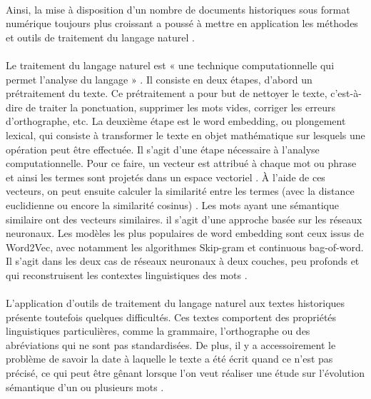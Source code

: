 \documentclass{article}
\begin{document}
\paragraph{}
Ainsi, la mise à disposition d’un nombre de documents historiques sous format numérique toujours plus croissant a poussé à mettre en application les méthodes et outils de traitement du langage naturel \cite[p. 1]{liebeskind2020deep}. 
\paragraph{}
Le traitement du langage naturel est « une technique computationnelle qui permet l’analyse du langage » \cite[p. 3]{di2021latin}. Il consiste en deux étapes, d’abord un prétraitement du texte. Ce prétraitement a pour but de nettoyer le texte, c’est-à-dire de traiter la ponctuation, supprimer les mots vides, corriger les erreurs d’orthographe, etc. La deuxième étape est le word embedding, ou plongement lexical, qui consiste à transformer le texte en objet mathématique sur lesquels une opération peut être effectuée. Il s’agit d’une étape nécessaire à l’analyse computationnelle. Pour ce faire, un vecteur est attribué à chaque mot ou phrase et ainsi les termes sont projetés dans un espace vectoriel \cite[p. 3]{di2021latin}. À l’aide de ces vecteurs, on peut ensuite calculer la similarité entre les termes (avec la distance euclidienne ou encore la similarité cosinus) \cite[p. 4]{di2021latin}. Les mots ayant une sémantique similaire ont des vecteurs similaires. il s’agit d’une approche basée sur les réseaux neuronaux. Les modèles les plus populaires de word embedding sont ceux issus de Word2Vec, avec notamment les algorithmes Skip-gram et continuous bag-of-word. Il s’agit dans les deux cas de réseaux neuronaux à deux couches, peu profonds et qui reconstruisent les contextes linguistiques des mots \cite[p. 7]{liebeskind2020deep}. 
\paragraph{}
L’application d’outils de traitement du langage naturel aux textes historiques présente toutefois quelques difficultés. Ces textes comportent des propriétés linguistiques particulières, comme la grammaire, l’orthographe ou des abréviations qui ne sont pas standardisées. De plus, il y a accessoirement le problème de savoir la date à laquelle le texte a été écrit quand ce n’est pas précisé, ce qui peut être gênant lorsque l’on veut réaliser une étude sur l’évolution sémantique d’un ou plusieurs mots \cite[p. 1]{liebeskind2020deep}. 
\end{document}
